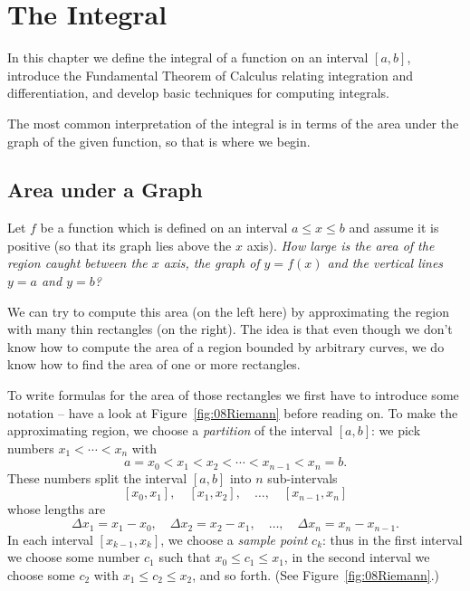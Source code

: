 \chapter{The Integral}
In this chapter we define the integral of a function on an interval $[a,b]$,
introduce the Fundamental Theorem of Calculus relating integration and
differentiation, and develop basic techniques for computing integrals.

The most common interpretation of the integral is in terms of the area under the
graph of the given function, so that is where we begin.


\section{Area under a Graph} %
Let $f$ be a function which is defined on an interval $a\leq x\leq
b$ and assume it is positive (so that its graph lies above
the $x$ axis). \textit{How large is the area of the region caught
  between the $x$ axis, the graph of $y=f(x)$ and the vertical lines
  $y=a$ and $y=b$?}
\begin{figure}[h]
    \parbox{0.45\textwidth}{}
    \parbox{0.45\textwidth}{}
\end{figure}
We can try to compute this area (on the left here) by approximating
the region with many thin rectangles (on the right).  The idea is that
even though we don't know how to compute the area of a region bounded
by arbitrary curves, we do know how to find the area of one or more
rectangles.

To write formulas for the area of those rectangles we first have to
introduce some notation -- have a look at Figure~\ref{fig:08Riemann}
before reading on.  To make the approximating region, we choose a
\emph{partition} of the interval $[a, b]$: we pick numbers
$x_1<\cdots<x_n$ with
\[
a=x_0 < x_1 < x_2 < \cdots < x_{n-1}< x_n = b.
\]
These numbers split the interval $[a, b]$ into $n$ sub-intervals
\[
[x_0, x_1], \quad [x_1, x_2],\quad \ldots,\quad [x_{n-1}, x_n]
\]
whose lengths are
\[
\Delta x_1 = x_1-x_0, \quad \Delta x_2 = x_2 - x_1, \quad\ldots, \quad
\Delta x_n = x_n-x_{n-1}.
\]
In each interval $[x_{k-1},x_k]$, we choose a \emph{sample point} $c_k$: thus in
the first interval we choose some number $c_1$ such that $x_0\leq c_1\leq x_1$,
in the second interval we choose some $c_2$ with $x_1\leq c_2\leq x_2$, and so
forth. (See Figure~\ref{fig:08Riemann}.)

